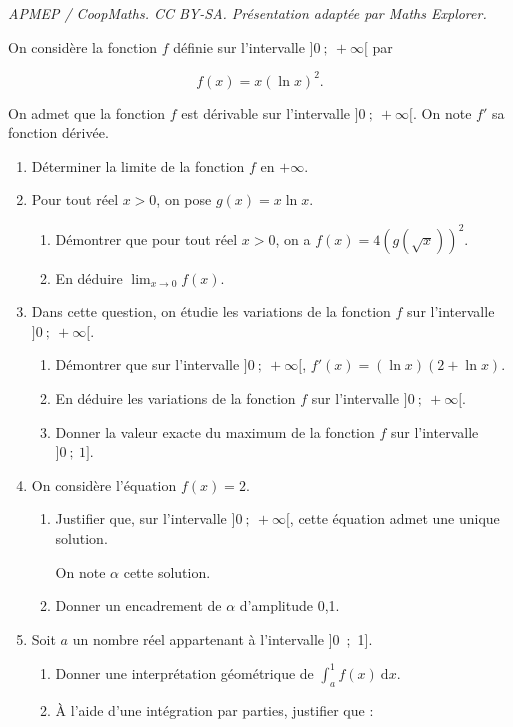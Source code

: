 \documentclass[10pt]{article}
\begin{document}
\noindent\textit{APMEP / CoopMaths. CC BY-SA. Présentation adaptée par Maths Explorer.}\par\medskip
On considère la fonction $f$ définie sur l'intervalle $]0~;~+\infty[$ par 

\[f(x) = x(\ln x)^2.\]

On admet que la fonction $f$ est dérivable sur l'intervalle $]0~;~+\infty[$. On note $f'$ sa fonction dérivée.

\medskip

\begin{enumerate}
\item Déterminer la limite de la fonction $f$ en $+\infty$.
\item Pour tout réel $x > 0$, on pose $g(x) = x\ln x$.
	\begin{enumerate}
		\item Démontrer que pour tout réel $x > 0$, on a $f(x) = 4\left(g\left(\sqrt x\right)\right)^2$.
		\item En déduire $\displaystyle\lim_{x \to 0} f(x)$.
	\end{enumerate}
\item Dans cette question, on étudie les variations de la fonction $f$ sur l'intervalle $]0~;~+\infty[$.
	\begin{enumerate}
		\item Démontrer que sur l'intervalle $]0~;~+\infty[$, \: $f'(x) = (\ln x)(2 + \ln x)$.
		\item En déduire les variations de la fonction $f$ sur l'intervalle $]0~;~+\infty[$.
		\item Donner la valeur exacte du maximum de la fonction $f$ sur l'intervalle $]0~;~1]$.
	\end{enumerate}
\item On considère l'équation $f (x) = 2$.
	\begin{enumerate}
		\item Justifier que, sur l'intervalle $]0~;~+\infty[$, cette équation admet une unique solution.

On note $\alpha$ cette solution.
		\item Donner un encadrement de $\alpha$ d'amplitude 0,1.
	\end{enumerate}
\item Soit $a$ un nombre réel appartenant à l'intervalle ]0~;~1].
	\begin{enumerate}
		\item Donner une interprétation géométrique de $\displaystyle\int_a^1 f(x)\: \text{d}x$.
		\item À l'aide d'une intégration par parties, justifier que : 


\end{enumerate}
\end{enumerate}
\end{document}
